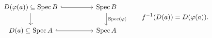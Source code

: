 \[
\begin{tikzcd}[column sep=huge]
D(\varphi(a))\subseteq\Spec B \arrow[r,hook] \arrow[d] & \Spec B \arrow[d,"\Spec(\varphi)"]\\
D(a)\subseteq\Spec A \arrow[r,hook] & \Spec A
\end{tikzcd}
\qquad f^{-1}(D(a))=D(\varphi(a)).
\]
